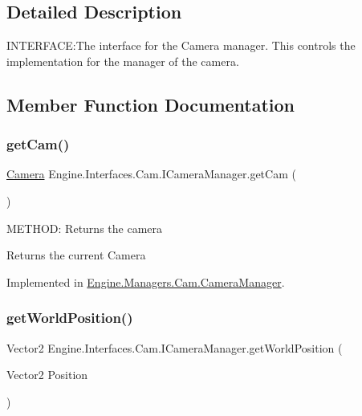 \subsection{Detailed Description}
I\+N\+T\+E\+R\+F\+A\+CE\+:The interface for the Camera manager. This controls the implementation for the manager of the camera. 



\subsection{Member Function Documentation}
\mbox{\label{a00422_a91fc1dab51b36fd8955451ac00fd2819}} 
\subsubsection{\texorpdfstring{get\+Cam()}{getCam()}}
{\footnotesize\ttfamily \hyperlink{a00490}{Camera} Engine.\+Interfaces.\+Cam.\+I\+Camera\+Manager.\+get\+Cam (\begin{DoxyParamCaption}{ }\end{DoxyParamCaption})}



M\+E\+T\+H\+OD\+: Returns the camera 

\begin{DoxyReturn}{Returns}
the current Camera
\end{DoxyReturn}


Implemented in \hyperlink{a00494_a949b09e5c57971945c3ccb638f73765d}{Engine.\+Managers.\+Cam.\+Camera\+Manager}.

\mbox{\label{a00422_a7d9fc1d792ddc3495bff23daac2a8d2a}} 
\subsubsection{\texorpdfstring{get\+World\+Position()}{getWorldPosition()}}
{\footnotesize\ttfamily Vector2 Engine.\+Interfaces.\+Cam.\+I\+Camera\+Manager.\+get\+World\+Position (\begin{DoxyParamCaption}\item[{Vector2}]{Position }\end{DoxyParamCaption})}



